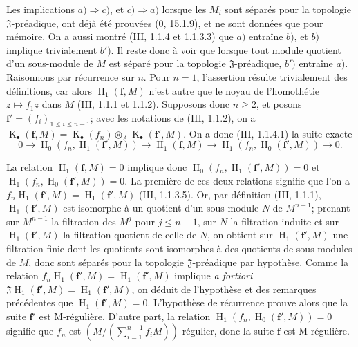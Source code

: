 Les implications $a)\Rightarrow c)$, et $c)\Rightarrow a)$ lorsque les $M_i$ sont séparés pour la topologie $\mathfrak J$-préadique, ont déjà été prouvées ($0$, 15.1.9), et ne sont données que pour mémoire. On a aussi montré (III, 1.1.4 et 1.1.3.3) que $a)$ entraîne $b)$, et $b)$ implique trivialement $b')$. Il reste donc à voir que lorsque tout module quotient d'un sous-module de $M$ est séparé pour la topologie $\mathfrak J$-préadique, $b')$ entraîne $a)$. Raisonnons par récurrence sur $n$. Pour $n=1$, l'assertion résulte trivialement des définitions, car alors $\operatorname{H}_1(\mathbf f,M)$ n'est autre que le noyau de l'homothétie $z\mapsto f_1z$ dans $M$ (III, 1.1.1 et 1.1.2). Supposons donc $n\geq2$, et posons $\mathbf f'=(f_i)_{1\leq i\leq n-1}$; avec les notations de (III, 1.1.2), on a $\operatorname{K}_\bullet(\mathbf f,M)=\operatorname{K}_\bullet(f_n)\otimes_A\operatorname{K}_\bullet(\mathbf f',M)$. On a donc (III, 1.1.4.1) la suite exacte
\begin{equation}
  0\longrightarrow\operatorname{H}_0(f_n,\operatorname{H}_1(\mathbf f',M))\longrightarrow\operatorname{H}_1(\mathbf f,M)\longrightarrow\operatorname{H}_1(f_n,\operatorname{H}_0(\mathbf f',M))\longrightarrow0.
  \tag{19.5.1.1}\label{IV.19.5.1.1}
\end{equation}


La relation $\operatorname{H}_1(\mathbf f,M)=0$ implique donc $\operatorname{H}_0(f_n,\operatorname{H}_1(\mathbf f',M))=0$ et $\operatorname{H}_1(f_n,\operatorname{H}_0(\mathbf f',M))=0$. La première de ces deux relations signifie que l'on a $f_n\operatorname{H}_1(\mathbf f',M)=\operatorname{H}_1(\mathbf f',M)$ (III, 1.1.3.5). Or, par définition (III, 1.1.1), $\operatorname{H}_1(\mathbf f',M)$ est isomorphe à un quotient d'un sous-module $N$ de $M^{n-1}$; prenant sur $M^{n-1}$ la filtration des $M^j$ pour $j\leq n-1$, sur $N$ la filtration induite et sur $\operatorname{H}_1(\mathbf f',M)$ la filtration quotient de celle de $N$, on obtient sur $\operatorname{H}_1(\mathbf f',M)$ une filtration finie dont les quotients sont isomorphes à des quotients de sous-modules de $M$, donc sont séparés pour la topologie $\mathfrak J$-préadique par hypothèse. Comme la relation $f_n\operatorname{H}_1(\mathbf f',M)=\operatorname{H}_1(\mathbf f',M)$ implique \emph{a fortiori} $\mathfrak J\operatorname{H}_1(\mathbf f',M)=\operatorname{H}_1(\mathbf f',M)$, on déduit de l'hypothèse et des remarques précédentes que $\operatorname{H}_1(\mathbf f',M)=0$. L'hypothèse de récurrence prouve alors que la suite $\mathbf f'$ est M-régulière. D'autre part, la relation $\operatorname{H}_1(f_n,\operatorname{H}_0(\mathbf f',M))=0$ signifie que $f_n$ est $(M/(\sum_{i=1}^{n-1}f_iM))$-régulier, donc la suite $\mathbf f$ est M-régulière.


